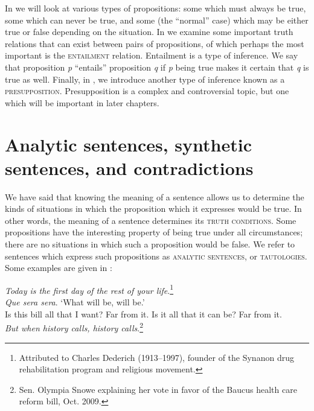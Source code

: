 In  we will look at various types of propositions: some which must always be true, some which can never be true, and some (the “normal” case) which may be either true or false depending on the situation. In  we examine some important truth relations that can exist between pairs of propositions, of which perhaps the most important is the \textsc{entailment} relation. Entailment is a type of inference. We say that proposition \textit{p} “entails” proposition \textit{q} if \textit{p} being true makes it certain that \textit{q} is true as well. Finally, in , we introduce another type of inference known as a \textsc{presupposition}. Presupposition is a complex and controversial topic, but one which will be important in later chapters.


\section{Analytic sentences, synthetic sentences, and contradictions}\label{sec:3.2}

We have said that knowing the meaning of a sentence allows us to determine the kinds of situations in which the proposition which it expresses would be true. In other words, the meaning of a sentence determines its \textsc{truth conditions}. Some propositions have the interesting property of being true under all circumstances; there are no situations in which such a proposition would be false. We refer to sentences which express such propositions as \textsc{analytic sentences}, or \textsc{tautologies}. Some examples are given in :


\ea \label{ex:3.3}
\ea \textit{Today is the first day of the rest of your life}.\footnote{Attributed to Charles Dederich (1913–1997), founder of the Synanon drug rehabilitation program and religious movement.}\\
\ex \textit{Que sera sera}. ‘What will be, will be.’\\
\ex Is this bill all that I want? Far from it. Is it all that it can be? Far from it.\\
  \textit{But when history calls, history calls}.\footnote{Sen. Olympia Snowe explaining her vote in favor of the Baucus health care reform bill, Oct. 2009.}
                       \z
\z


